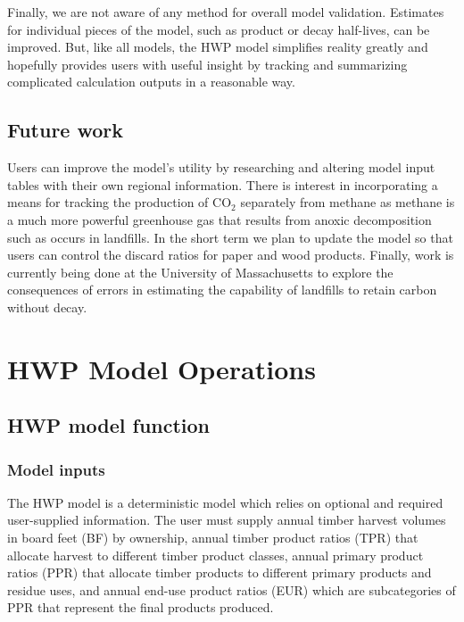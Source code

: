 \documentclass[
]{book}
\begin{document}
Finally, we are not aware of any method for overall model validation. Estimates for individual pieces of the model, such as product or decay half-lives, can be improved. But, like all models, the HWP model simplifies reality greatly and hopefully provides users with useful insight by tracking and summarizing complicated calculation outputs in a reasonable way.

\hypertarget{int-future}{%
\section{Future work}\label{int-future}}

Users can improve the model's utility by researching and altering model input tables with their own regional information. There is interest in incorporating a means for tracking the production of CO\(_2\) separately from methane as methane is a much more powerful greenhouse gas that results from anoxic decomposition such as occurs in landfills. In the short term we plan to update the model so that users can control the discard ratios for paper and wood products. Finally, work is currently being done at the University of Massachusetts to explore the consequences of errors in estimating the capability of landfills to retain carbon without decay.

\hypertarget{model}{%
\chapter{HWP Model Operations}\label{model}}

\hypertarget{model-func}{%
\section{HWP model function}\label{model-func}}

\hypertarget{model-func-inp}{%
\subsection{Model inputs}\label{model-func-inp}}

The HWP model is a deterministic model which relies on optional and required user-supplied information. The user must supply annual timber harvest volumes in board feet (BF) by ownership, annual timber product ratios (TPR) that allocate harvest to different timber product classes, annual primary product ratios (PPR) that allocate timber products to different primary products and residue uses, and annual end-use product ratios (EUR) which are subcategories of PPR that represent the final products produced.
\end{document}
